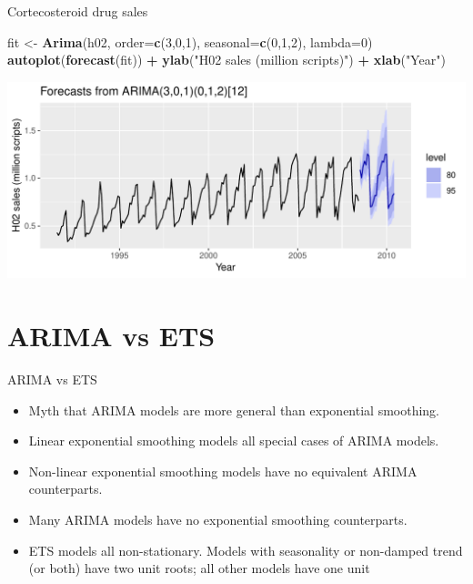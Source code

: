 \documentclass[14pt,ignorenonframetext,]{beamer}
\newenvironment{Shaded}{\begin{snugshade}}{\end{snugshade}}
\newcommand{\KeywordTok}[1]{\textcolor[rgb]{0.13,0.29,0.53}{\textbf{#1}}}
\newcommand{\DataTypeTok}[1]{\textcolor[rgb]{0.13,0.29,0.53}{#1}}
\newcommand{\DecValTok}[1]{\textcolor[rgb]{0.00,0.00,0.81}{#1}}
\newcommand{\StringTok}[1]{\textcolor[rgb]{0.31,0.60,0.02}{#1}}
\newcommand{\OperatorTok}[1]{\textcolor[rgb]{0.81,0.36,0.00}{\textbf{#1}}}
\newcommand{\NormalTok}[1]{#1}
\begin{document}
\begin{frame}[fragile]{Cortecosteroid drug sales}

\fontsize{11}{14}\sf

\begin{Shaded}
\begin{Highlighting}[]
\NormalTok{fit <-}\StringTok{ }\KeywordTok{Arima}\NormalTok{(h02, }\DataTypeTok{order=}\KeywordTok{c}\NormalTok{(}\DecValTok{3}\NormalTok{,}\DecValTok{0}\NormalTok{,}\DecValTok{1}\NormalTok{), }\DataTypeTok{seasonal=}\KeywordTok{c}\NormalTok{(}\DecValTok{0}\NormalTok{,}\DecValTok{1}\NormalTok{,}\DecValTok{2}\NormalTok{),}
  \DataTypeTok{lambda=}\DecValTok{0}\NormalTok{)}
\KeywordTok{autoplot}\NormalTok{(}\KeywordTok{forecast}\NormalTok{(fit)) }\OperatorTok{+}
\StringTok{  }\KeywordTok{ylab}\NormalTok{(}\StringTok{"H02 sales (million scripts)"}\NormalTok{) }\OperatorTok{+}\StringTok{ }\KeywordTok{xlab}\NormalTok{(}\StringTok{"Year"}\NormalTok{)}
\end{Highlighting}
\end{Shaded}

\includegraphics{week_5_arima_files/figure-beamer/h02f-1.pdf}

\end{frame}

\section{ARIMA vs ETS}\label{arima-vs-ets}

\begin{frame}{ARIMA vs ETS}

\begin{itemize}
\item
  Myth that ARIMA models are more general than exponential smoothing.
\item
  Linear exponential smoothing models all special cases of ARIMA models.
\item
  Non-linear exponential smoothing models have no equivalent ARIMA
  counterparts.
\item
  Many ARIMA models have no exponential smoothing counterparts.
\item
  ETS models all non-stationary. Models with seasonality or non-damped
  trend (or both) have two unit roots; all other models have one unit
\end{itemize}

\vspace*{10cm}

\end{frame}
\end{document}
